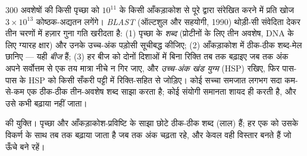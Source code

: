 \begin{definition}[BLAST]\label{def:b3:bioinformatics:blast}
\num{300} अवशेषों की किसी पृच्छा को $10^{11}$ के किसी आँकड़ाकोश से पूरे
 द्वारा संरेखित करने में प्रति खोज $3\times 10^{13}$
कोष्ठक-अद्यतन लगेंगे। \emph{BLAST} (ऑल्टशुल और सहयोगी, 1990) थोड़ी-सी
संवेदिता देकर तीन चरणों में हज़ार गुना गति खरीदता है: (1) पृच्छा के
\emph{शब्द} (प्रोटीनों के लिए तीन अवशेष, DNA के लिए ग्यारह क्षार) और
उनके उच्च-अंक पड़ोसी सूचीबद्ध कीजिए; (2) आँकड़ाकोश में ठीक-ठीक
शब्द-मेल छानिए --- यही \emph{बीज} हैं; (3) हर बीज को दोनों दिशाओं में
बिना रिक्ति तब तक बढ़ाइए जब तक अंक अपने सर्वोत्तम से एक तय मात्रा नीचे
न गिर जाए, और \emph{उच्च-अंक खंड युग्म} (HSP) रखिए, फिर पास-पास के HSP
को किसी सँकरी पट्टी में रिक्ति-सहित  से जोड़िए। कोई सच्चा
समजात लगभग सदा कम-से-कम एक ठीक-ठीक तीन-अवशेष शब्द साझा करता है; कोई
संयोगी समानता शायद ही करती है, और उसे कभी बढ़ाया नहीं जाता।
\end{definition}

\begin{omfigure}

{\small {} की युक्ति। पृच्छा और आँकड़ाकोश-प्रविष्टि के साझा छोटे
ठीक-ठीक शब्द (लाल)  हैं; हर एक को उसके विकर्ण के साथ तब तक बढ़ाया
जाता है जब तक अंक चढ़ता रहे, और केवल वही विस्तार 
बनते हैं जो ऊँचे बने रहें।}
\end{omfigure}

